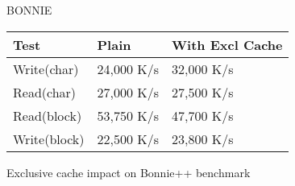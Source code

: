 \documentclass[11pt]{article}
\begin{document}
BONNIE


\begin{center}
\begin{tabular}{lll}
 Test          &  Plain       &  With Excl Cache  \\
\hline
 Write(char)   &  24,000 K/s  &  32,000 K/s       \\
 Read(char)    &  27,000 K/s  &  27,500 K/s       \\
 Read(block)   &  53,750 K/s  &  47,700 K/s       \\
 Write(block)  &  22,500 K/s  &  23,800 K/s       \\
\end{tabular}
\caption{Exclusive cache impact on Bonnie++ benchmark}
\end{center}
\end{document}
